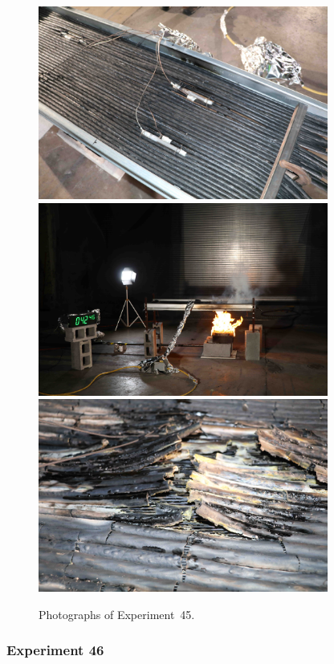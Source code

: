 \begin{figure}[p]
\centering
\includegraphics[height=2.50in]{../FIGURES/Test_45_setup} \\
\includegraphics[height=2.50in]{../FIGURES/Test_45_42_min_46_s} \\
\includegraphics[height=2.50in]{../FIGURES/Test_45_damage}
\caption[Photographs of Experiment~45]{Photographs of Experiment~45.}
\label{fig:Test_45_photos}
\end{figure}


\clearpage

\subsubsection{Experiment 46}

